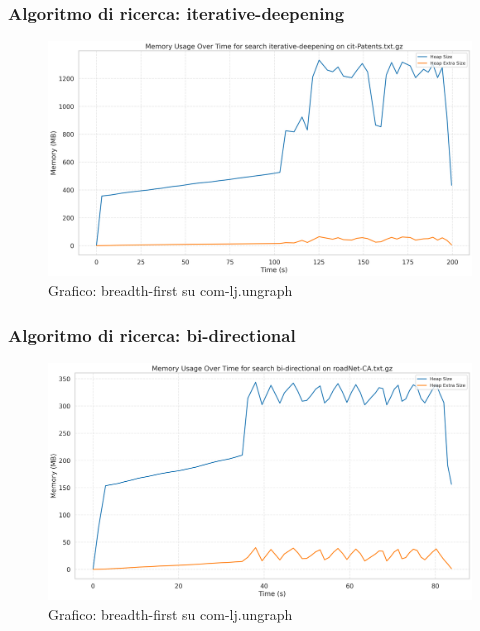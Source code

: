 \documentclass{article}
\begin{document}
\subsubsection{Algoritmo di ricerca: iterative-deepening}
\begin{figure}[h]\centering
\includegraphics[width=\textwidth]{../plots/cit-Patents_iterative-deepening.png}
\caption{Grafico: breadth-first su com-lj.ungraph}
\end{figure}
\subsubsection{Algoritmo di ricerca: bi-directional}
\begin{figure}[h]\centering
\includegraphics[width=\textwidth]{../plots/roadNet-CA_bi-directional.png}
\caption{Grafico: breadth-first su com-lj.ungraph}
\end{figure}
\end{document}
